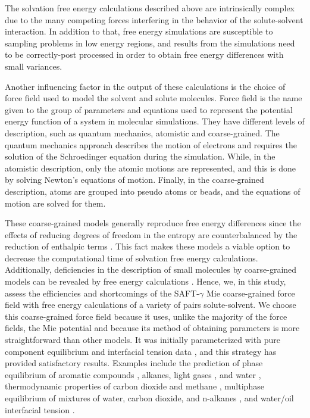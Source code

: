 The solvation free energy calculations described above are intrinsically complex due to the many competing forces interfering in the behavior of the solute-solvent interaction. In addition to that, free energy simulations are susceptible to sampling problems in low energy regions, and results from the simulations need to be correctly-post processed in order to obtain free energy differences with small variances. {Another influencing factor in the output of these calculations is the choice of force field used to model the solvent and solute molecules. Force field is the name given to the group of parameters and equations used to represent the potential energy function of a system in molecular simulations. They have different levels of description, such as quantum mechanics, atomistic and coarse-grained. The quantum mechanics approach describes the motion of electrons and requires the solution of the Schroedinger equation during the simulation. While, in the atomistic description, only the atomic motions are represented,  and this is done by solving Newton's equations of motion. Finally, in the coarse-grained description, atoms are grouped into pseudo atoms or beads, and the equations of motion are solved for them. 
	
These coarse-grained models generally reproduce free energy differences since the effects of reducing degrees of freedom in the entropy are counterbalanced by the reduction of enthalpic terms \cite{kmiecik2016}. This fact makes these models a viable option to decrease the computational time of solvation free energy calculations. Additionally, deficiencies in the description of small molecules by coarse-grained models can be revealed by free energy calculations \cite{mobley2007,shirts2013}. Hence, we, in this study, assess the efficiencies and shortcomings of the SAFT-$\gamma$ Mie coarse-grained force field  \cite{avendano2011} with free energy calculations of a variety of pairs solute-solvent. We choose this coarse-grained force field because it uses, unlike the majority of the force fields, the Mie potential \cite{MIE} and because its method of obtaining parameters is more straightforward than other models. It was initially parameterized with pure component equilibrium and interfacial tension data \cite{avendano2011}, and this strategy has provided satisfactory results. Examples include the prediction of phase equilibrium of aromatic compounds \cite{muller2017}, alkanes, light gases \cite{herdes2015}, and water \cite{lobanova2015}, thermodynamic properties of carbon dioxide and methane \cite{cassiano1}, multiphase equilibrium of mixtures of water, carbon dioxide, and n-alkanes \cite{lobanova2016}, and water/oil interfacial tension \cite{herdes2017}.} 


